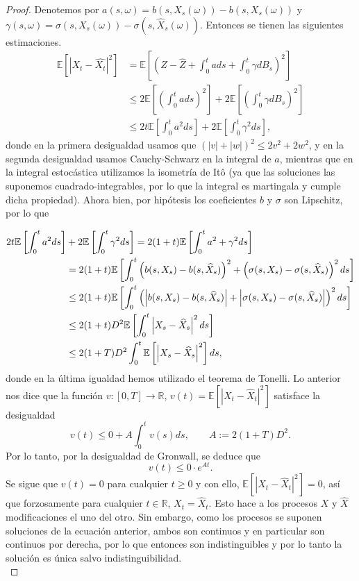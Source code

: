 \documentclass[letterpaper]{article}
\newcommand{\R}{\mathbb{R}}
\newcommand{\abs}[1]{\left\lvert #1 \right\rvert}
\renewcommand{\to}{\rightarrow}
\newcommand{\E}{\mathbb{E}}
\newcommand{\1}{\mathds{1}}
\theoremstyle{definition}
\theoremstyle{definition}
\theoremstyle{definition}
\theoremstyle{definition}
\theoremstyle{definition}
\begin{document}
\begin{enumerate}
\begin{proof}
       Denotemos por $a(s,\omega)=b(s,X_s(\omega))-b(s,X_s(\omega))$ y $\gamma(s,\omega)=\sigma(s,X_s(\omega))-\sigma(s,\widehat{X}_s(\omega))$. Entonces 
       se tienen las siguientes estimaciones.
       \begin{align*}
        \E\left[\abs{X_t-\widehat{X_t}}^2\right]&=\E\left[\left(Z-\widehat{Z}+\int_0^{t}a ds + \int_0^{t}\gamma dB_s\right)^2\right]\\
        &\leq  2 \E\left[\left(\int_0^{t}a ds\right)^2\right] +2 \E\left[ \left(\int_0^{t}\gamma dB_s\right)^2\right]\\
        &\leq 2t \E\left[\int_0^{t}a^2 ds\right] +2\E\left[ \int_0^{t}\gamma^2ds\right],
    \end{align*}
        donde en la primera desigualdad usamos que $(|v|+|w|)^2\leq 2v^2+2w^2$, y en la segunda 
        desigualdad usamos Cauchy-Schwarz en la integral de $a$, mientras que en la integral estocástica utilizamos 
        la isometría de Itô (ya que las soluciones las suponemos cuadrado-integrables, por lo que la integral es martingala y cumple dicha propiedad).
         Ahora bien, por hipótesis los coeficientes $b$ y $\sigma$ son Lipschitz, por lo que 
        
        \begin{align}
            2t \E\left[\int_0^{t}a^2 ds\right] &+2 \E\left[ \int_0^{t}\gamma^2ds\right]= 2(1+t)\E\left[\int_0^{t}a^2 +\gamma^2ds\right]\notag\\
            &=2(1+t)\E\left[\int_0^{t} \left(b(s,X_s)-b(s,\widehat{X}_s)\right)^2+\left(\sigma(s,X_s)-\sigma(s,\widehat{X}_s)\right)^2ds\right]\notag\\
            &\leq 2(1+t)\E\left[\int_0^{t} \left(\abs{b(s,X_s)-b(s,\widehat{X}_s)}+\abs{\sigma(s,X_s)-\sigma(s,\widehat{X}_s)}\right)^2ds\right]\notag\\
            &\leq 2(1+t)D^2\E\left[\int_0^{t} \abs{X_s-\widehat{X}_s}^2ds\right]\notag\\
            &\leq2(1+T)D^2\int_0^{t} \E\left[\abs{X_s-\widehat{X}_s}^2\right]ds\label{eq2},
        \end{align}
        donde en la última igualdad hemos utilizado el teorema de Tonelli.
        Lo anterior nos dice que la función $v:[0,T]\to \R$, $v(t)=\E\left[\abs{X_t-\widehat{X}_t}^2\right]$
        satisface la desigualdad 
        \[
        v(t)\leq 0+A\int_{0}^{t}v(s)ds, \qquad A:=2(1+T)D^2.
        \]
        Por lo tanto, por la desigualdad de Gronwall, se deduce que 
        \[
        v(t)\leq 0\cdot e^{At}.    
        \]
        Se sigue que $v(t)=0$ para cualquier $t\geq0$ y con ello, $\E\left[\abs{X_t-\widehat{X}_t}^2\right]=0$, así que 
        forzosamente para cualquier $t\in \R$, $X_t=\hat{X}_t$. Esto hace a los procesos $X$ y $\hat{X}$ modificaciones el uno del otro.
        Sin embargo, como los procesos se suponen soluciones de la ecuación anterior, ambos son continuos y en particular son continuos por derecha, por lo que entonces son indistinguibles y por 
        lo tanto la solución es única salvo indistinguibilidad.\\


\end{proof}
\end{enumerate}
\end{document}
